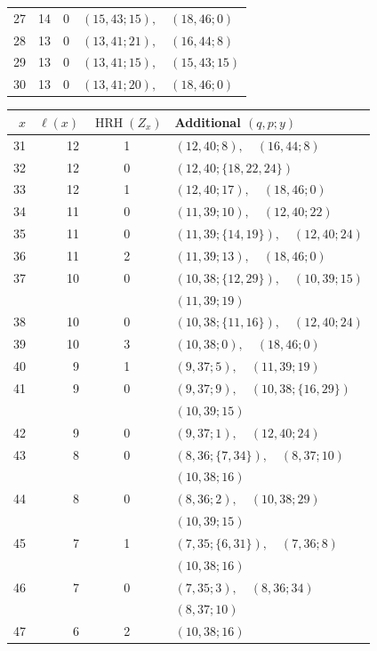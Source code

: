 \documentclass[12pt]{amsart}
\theoremstyle{definition}
\numberwithin{equation}{section}
\begin{document}
\begin{table}[!htbp]
\begin{minipage}{\textwidth}
{\begin{minipage}[t]{0.49\textwidth}
\begin{tabular}{@{}rrcl@{}}
27 & 14 & 0 & $(15,43;15),\quad (18,46;0)$\\
28 & 13 & 0 & $(13,41;21),\quad (16,44;8)$\\
29 & 13 & 0 & $(13,41;15),\quad (15,43;15)$\\
30 & 13 & 0 & $(13,41;20),\quad (18,46;0)$\\
\hline
\end{tabular}
\end{minipage}\hfill
\begin{minipage}[t]{0.49\textwidth}
\vspace{0pt}\centering
\begin{tabular}{@{}rrcl@{}}
\hline
$x$ & $\ell(x)$ & $\operatorname{HRH}(Z_x)$ & Additional $(q,p;y)$\\
\hline
31 & 12 & 1 & $(12,40;8),\quad (16,44;8)$\\
32 & 12 & 0 & $(12,40;\{18,22,24\})$\\
33 & 12 & 1 & $(12,40;17),\quad (18,46;0)$\\
34 & 11 & 0 & $(11,39;10),\quad (12,40;22)$\\
35 & 11 & 0 & $(11,39;\{14,19\}),\quad (12,40;24)$\\
36 & 11 & 2 & $(11,39;13),\quad (18,46;0)$\\
37 & 10 & 0 & $(10,38;\{12,29\}),\quad (10,39;15)$\\
 & &  & $(11,39;19)$\\
38 & 10 & 0 & $(10,38;\{11,16\}),\quad (12,40;24)$\\
39 & 10 & 3 & $(10,38;0),\quad (18,46;0)$\\
40 & 9 & 1 & $(9,37;5),\quad (11,39;19)$\\
41 & 9 & 0 & $(9,37;9),\quad (10,38;\{16,29\})$\\
 & &  & $(10,39;15)$\\
42 & 9 & 0 & $(9,37;1),\quad (12,40;24)$\\
43 & 8 & 0 & $(8,36;\{7,34\}),\quad (8,37;10)$\\
 & &  & $(10,38;16)$\\
44 & 8 & 0 & $(8,36;2),\quad (10,38;29)$\\
 & &  & $(10,39;15)$\\
45 & 7 & 1 & $(7,35;\{6,31\}),\quad (7,36;8)$\\
 & &  & $(10,38;16)$\\
46 & 7 & 0 & $(7,35;3),\quad (8,36;34)$\\
 & &  & $(8,37;10)$\\
47 & 6 & 2 & $(10,38;16)$\\

\end{tabular}
\end{minipage}}
\end{minipage}
\end{table}
\end{document}
